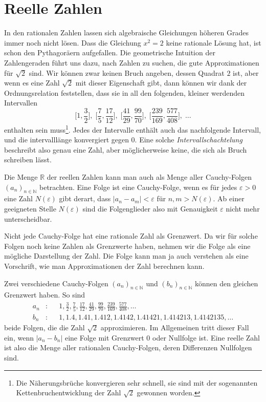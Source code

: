 %
%
%
\section{Reelle Zahlen
\label{buch:section:reelle-zahlen}}
In den rationalen Zahlen lassen sich algebraische Gleichungen höheren
Grades immer noch nicht lösen.
Dass die Gleichung $x^2=2$ keine rationale Lösung hat, ist schon den
Pythagoräern aufgefallen.
Die geometrische Intuition der Zahlengeraden führt uns dazu, nach
Zahlen zu suchen, die gute Approximationen für $\sqrt{2}$ sind.
Wir können zwar keinen Bruch angeben, dessen Quadrat $2$ ist, aber
wenn es eine Zahl $\sqrt{2}$ mit dieser Eigenschaft gibt, dann können
wir dank der Ordnungsrelation feststellen, dass sie in all den folgenden,
kleiner werdenden Intervallen
\[
\biggl[1,\frac32\biggr],\;
\biggl[\frac75,\frac{17}{12}\biggr],\;
\biggl[\frac{41}{29},\frac{99}{70}\biggr],\;
\biggl[\frac{239}{169},\frac{577}{408}\biggr],\;
\dots
\]
enthalten sein muss\footnote{Die Näherungsbrüche konvergieren sehr
schnell, sie sind mit der sogenannten Kettenbruchentwicklung der
Zahl $\sqrt{2}$ gewonnen worden.}.
Jedes der Intervalle enthält auch das nachfolgende Intervall, und
die intervalllänge konvergiert gegen 0.
Eine solche \emph{Intervallschachtelung} beschreibt also genau eine Zahl,
aber möglicherweise keine, die sich als Bruch schreiben lässt.

Die Menge $\mathbb{R}$ der reellen Zahlen kann man auch als Menge
aller Cauchy-Folgen $(a_n)_{n\in\mathbb{N}}$ betrachten.
Eine Folge ist eine Cauchy-Folge, wenn es für jedes $\varepsilon>0$
eine Zahl $N(\varepsilon)$ gibt derart, dass $|a_n-a_m|<\varepsilon$
für $n,m>N(\varepsilon)$.
Ab einer geeigneten Stelle $N(\varepsilon)$ sind die Folgenglieder also
mit Genauigkeit $\varepsilon$ nicht mehr unterscheidbar.

Nicht jede Cauchy-Folge hat eine rationale Zahl als Grenzwert.
Da wir für solche Folgen noch keine Zahlen als Grenzwerte haben,
nehmen wir die Folge als eine mögliche Darstellung der Zahl.
Die Folge kann man ja auch verstehen als eine Vorschrift, wie man
Approximationen der Zahl berechnen kann.

Zwei verschiedene Cauchy-Folgen $(a_n)_{n\in\mathbb{N}}$ und
$(b_n)_{n\in\mathbb{N}}$ 
können den gleichen Grenzwert haben.
So sind 
\[
\begin{aligned}
a_n&\colon&&
1,\frac32,\frac75,\frac{17}{12},\frac{41}{29},\frac{99}{70},\frac{239}{169},
\frac{577}{408},\dots
\\
b_n&\colon&&
1,1.4,1.41,1.412,1.4142,1.41421,1.414213,1.4142135,\dots
\end{aligned}
\]
beide Folgen, die die Zahl $\sqrt{2}$ approximieren.
Im Allgemeinen tritt dieser Fall ein, wenn $|a_n-b_n|$ eine
Folge mit Grenzwert $0$ oder Nullfolge ist.
Eine reelle Zahl ist also die Menge aller rationalen Cauchy-Folgen,
deren Differenzen Nullfolgen sind.

